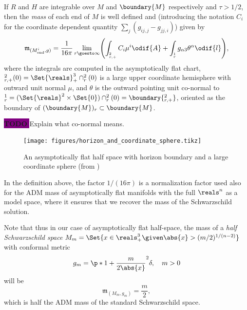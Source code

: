 \documentclass[titlepage,numbers=noenddot,headinclude,oneside,%
footinclude=true,cleardoublepage=empty,%
BCOR=5mm,paper=a4,fontsize=11pt,%
english,%
]{scrartcl}
\let\sphere\relax
\newcommand{\sphere}{\mathbb{S}}
\newcommand{\mass}[2]{\mathfrak{m}_{(#1,#2)}} %
\newcommand{\todomark}{%
    \colorbox{purple}{%
        \textnormal\ttfamily\bfseries\color{white}%
        TODO%
    }%
}
\newcommand{\todo}[1][]{%
    \ifstrempty{#1}{%
        \def\todotext{Todo}%
    }{%
        \def\todotext{Todo: #1}%
    }%
    \todomark%
    {%
        \marginpar{%
            \raggedright\normalfont\sffamily\scriptsize\todotext%
        }%
    }%
}
\begin{document}
\begin{definition}\label{def:half_space_mass}
    If \( R \) and \( H \) are integrable over \( M \) and \( \boundary{M} \) respectively and \( \tau>1/2 \), then the \emph{mass} of each end of \( M \) is well defined and (introducing the notation \( C_i \) for the coordinate dependent quantity \( \sum_j (g_{ij,j}-g_{jj,i}) \)) given by
    \begin{equation*}
        \mass{M_{\mathrm{end}}^i}{g}=\frac{1}{16\pi}\lim_{r \goesto \infty}\Biggl(\int_{\sphere_{r,+}^{2}}C_i\mu^i\odif{A}+\int_{\sphere_r^{1}}g_{\alpha 3}\theta^\alpha\odif{l}\Biggr),
    \end{equation*}
    where the integrals are computed in the asymptotically flat chart, \( \sphere_{r,+}^{2}(0)=\Set{\reals}^3_+\cap \sphere_r^2(0) \) is a large upper coordinate hemisphere with outward unit normal \( \mu \), and \( \theta \) is the outward pointing unit co-normal to \( \sphere_{r}^1=(\Set{\reals}^2\times \Set{0})\cap \sphere_r^2(0)=\boundary{\sphere_{r,+}^2} \), oriented as the boundary of \( (\boundary{M})_r\subset \boundary{M} \).

    \todo{Explain what co-normal means.}
\end{definition}
\begin{figure}[H]
    \centering
    \texttt{[image: figures/horizon\_and\_coordinate\_sphere.tikz]}
    \caption{An asymptotically flat half space with horizon boundary and a large coordinate sphere (from )}
    \label{fig:horizon_and_coordinate_spher}
\end{figure}
\begin{remark}
    In the definition above, the factor \( 1/(16\pi) \)  is a normalization factor used also for the ADM mass of asymptotically flat manifolds with the full \( \reals^n \) as a model space, where it ensures that we recover the mass of the Schwarzschild solution. 
    
    Note that thus in our case of asymptotically flat half-space, the mass of a \emph{half Schwarzschild space} \( M_m=\Set{x\in \reals^3_+\given \abs{x}>(m/2)^{1/(n-2)}} \) with conformal metric
    \begin{equation*}
        g_m=\p*{1+\frac{m}{2\abs{x}}}^{2}\delta,\quad m>0
    \end{equation*}
    will be
    \begin{equation*}
        \mass{M_m}{g_m}=\frac{m}{2},
    \end{equation*}
    which is half the ADM mass of the standard Schwarzschild space.
\end{remark}
\end{document}
